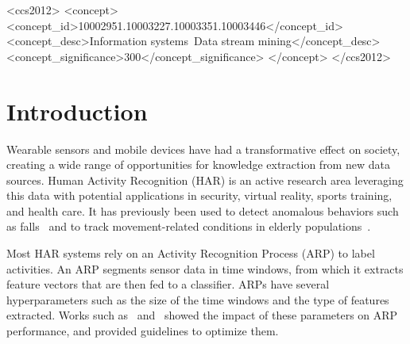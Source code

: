 \documentclass[sigconf]{acmart}
\begin{document}
%
%

\begin{CCSXML}
<ccs2012>
<concept>
<concept_id>10002951.10003227.10003351.10003446</concept_id>
<concept_desc>Information systems~Data stream mining</concept_desc>
<concept_significance>300</concept_significance>
</concept>
</ccs2012>
\end{CCSXML}



%


%


%
\maketitle

\section{Introduction}

Wearable sensors and mobile devices have had a transformative effect on society,
creating a wide range of opportunities for knowledge 
extraction from new data sources. Human Activity Recognition (HAR) is an
active research area leveraging this data with potential applications in security, virtual
reality, sports training, and health care. It has previously been used to
detect anomalous behaviors such as falls~\cite{bianchi2010barometric} and
to track movement-related conditions in elderly populations~\cite{chen2014implementing}.

Most HAR systems rely on an Activity 
Recognition Process (ARP) to label activities. An ARP segments sensor data in
time windows, from which it extracts feature vectors that are then fed to a classifier.
ARPs have several hyperparameters such as the size of the time windows and the 
type of features extracted. Works such as~\cite{banos2014window} 
and~\cite{sousa2017comparative} showed the impact of these parameters on 
ARP performance, and provided guidelines to optimize them.
\end{document}
